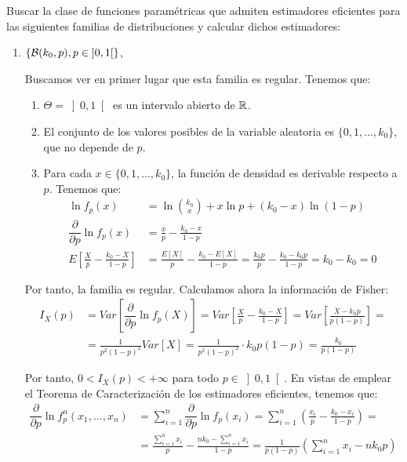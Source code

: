 \begin{ejemplo}
    Buscar la clase de funciones paramétricas que admiten estimadores eficientes para las siguientes familias de distribuciones y calcular dichos estimadores:
    \begin{enumerate}
        \item $\{\mathcal{B}(k_0, p), p \in \left]0, 1\right[\}$,
        
        Buscamos ver en primer lugar que esta familia es regular. Tenemos que:
        \begin{enumerate}
            \item $\Theta=\left]0, 1\right[$ es un intervalo abierto de $\mathbb{R}$.
            \item El conjunto de los valores posibles de la variable aleatoria es $\{0, 1, \ldots, k_0\}$, que no depende de $p$.
            \item Para cada $x \in \{0, 1, \ldots, k_0\}$, la función de densidad es derivable respecto a $p$. Tenemos que:
            \begin{align*}
                \ln f_p(x) &= \ln\binom{k_0}{x} + x\ln p + (k_0-x)\ln(1-p)\\
                \dfrac{\partial}{\partial p}\ln f_p(x) &= \frac{x}{p} - \frac{k_0-x}{1-p}\\
                E\left[\frac{X}{p} - \frac{k_0-X}{1-p}\right] &= \frac{E[X]}{p} - \frac{k_0-E[X]}{1-p} = \frac{k_0p}{p} - \frac{k_0-k_0p}{1-p} = k_0 - k_0 = 0
            \end{align*}
        \end{enumerate}

        Por tanto, la familia es regular. Calculamos ahora la información de Fisher:
        \begin{align*}
            I_X(p) &= Var\left[\dfrac{\partial}{\partial p}\ln f_p(X)\right] = Var\left[\frac{X}{p} - \frac{k_0-X}{1-p}\right] = Var\left[\frac{X-k_0p}{p(1-p)}\right] =\\&= \frac{1}{p^2(1-p)^2} Var[X] = \frac{1}{p^2(1-p)^2} \cdot k_0p(1-p) = \frac{k_0}{p(1-p)}
        \end{align*}

        Por tanto, $0< I_X(p) < +\infty$ para todo $p \in \left]0, 1\right[$. En vistas de emplear el Teorema de Caracterización de los estimadores eficientes, tenemos que:
        \begin{align*}
            \dfrac{\partial}{\partial p}\ln f_p^n(x_1, \ldots, x_n) &= \sum_{i=1}^n \dfrac{\partial}{\partial p}\ln f_p(x_i) = \sum_{i=1}^n \left(\frac{x_i}{p} - \frac{k_0-x_i}{1-p}\right) =\\&= \frac{\sum\limits_{i=1}^n x_i}{p} - \frac{nk_0-\sum\limits_{i=1}^n x_i}{1-p} = \frac{1}{p(1-p)}\left(\sum\limits_{i=1}^n x_i - nk_0p\right)
        \end{align*}


\end{enumerate}
\end{ejemplo}
